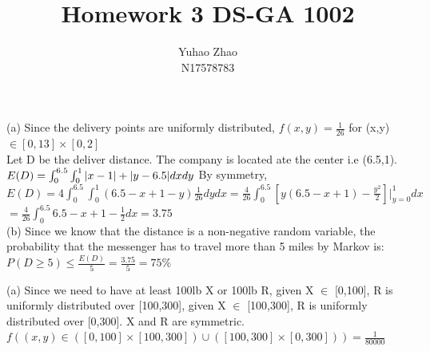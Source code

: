 \documentclass[11pt]{article}
\newenvironment{problem}[2][Problem]{\begin{trivlist}
\item[\hskip \labelsep {\bfseries #1}\hskip \labelsep {\bfseries #2.}]}{\end{trivlist}}
\begin{document}
 
 
\title{Homework 3 DS-GA 1002 }%
\author{Yuhao Zhao\\ %
N17578783} %
 
\maketitle
\begin{problem}{1}
\end{problem}
(a) Since the delivery points are uniformly distributed, $f(x,y)  = \frac{1}{26}$ for  (x,y) $\in [0,13] \times [0,2]$\\
Let D be the deliver distance. The company is located ate the center i.e (6.5,1). \\
$E(D) = \int_{0}^{6.5} \int_{0}^{1} |x - 1|+|y-6.5|dxdy \\$
By symmetry, $E(D) = 4 \int_{0}^{6.5} \int_{0}^{1} (6.5 -x + 1 - y) \frac{1}{26} dy dx = \frac{4}{26} \int_{0}^{6.5} [y(6.5 - x +1) - \frac{y^2}{2}] |_{y=0}^1 dx$\\
$=\frac{4}{26} \int_{0}^{6.5} 6.5 - x +1 - \frac{1}{2}dx = 3.75$ \\

(b) Since we know that the distance is a non-negative random variable, the probability that the messenger has to travel more than 5 miles by Markov is: 
$P(D \geq 5) \leq \frac{E(D)}{5} = \frac{3.75}{5} = 75\%$

\begin{problem}{2}
\end{problem}
 (a) Since we need to have at least 100lb X or 100lb R, given X $\in$ [0,100], R is uniformly distributed over [100,300], given X $\in$ [100,300], R is uniformly distributed over [0,300]. X and R are symmetric. $f((x,y)\in ([0,100]\times [100,300]) \cup ([100,300] \times [0,300])) = \frac{1}{80000}$
\end{document}
